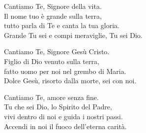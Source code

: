 
\strofa Cantiamo Te, Signore della vita.\\
Il nome tuo è grande sulla terra,\\
tutto parla di Te e canta la tua gloria.\\
Grande Tu sei e compi meraviglie, Tu sei Dio.

\spazio

\strofa Cantiamo Te, Signore Gesù Cristo.\\
Figlio di Dio venuto sulla terra,\\
fatto uomo per noi nel grembo di Maria.\\
Dolce Gesù, risorto dalla morte, sei con noi.

\spazio

\strofa Cantiamo Te, amore senza fine.\\
Tu che sei Dio, lo Spirito del Padre,\\
vivi dentro di noi e guida i nostri passi.\\
Accendi in noi il fuoco dell'eterna carità.
